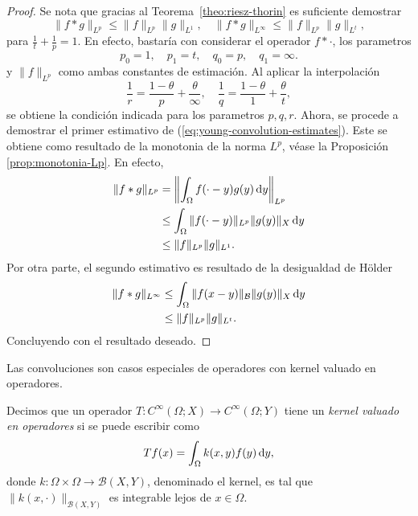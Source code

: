 \begin{proof}
    Se nota que gracias al Teorema~\ref{theo:riesz-thorin} es suficiente 
    demostrar 
    \begin{equation}\label{eq:young-convolution-estimates}
        \|f*g\|_{L^p} \leq \|f\|_{L^p} \|g\|_{L^1}, \quad 
        \|f*g\|_{L^\infty} \leq \|f\|_{L^p} \|g\|_{L^t},
    \end{equation}
    para $\frac{1}{t} + \frac{1}{p} = 1$. En efecto, bastaría con considerar 
    el operador $f * \cdot$, los parametros
    \begin{equation*}
        p_0 = 1, \quad p_1 = t, \quad q_0 = p, \quad q_1 = \infty.
    \end{equation*}
    y $\|f\|_{L^p}$ como ambas constantes de estimación.
    Al aplicar la interpolación
    \begin{equation*}
        \frac{1}{r} = \frac{1-\theta}{p} + \frac{\theta}{\infty}, \quad 
        \frac{1}{q} = \frac{1-\theta}{1} + \frac{\theta}{t},
    \end{equation*}
    se obtiene la condición indicada para los parametros $p, q, r$. Ahora, 
    se procede a demostrar el primer estimativo de
    (\ref{eq:young-convolution-estimates}). Este se obtiene como resultado de
    la monotonia de la norma $L^p$, véase la Proposición \ref{prop:monotonia-Lp}.
    En efecto,
    \begin{align*}
        \|f*g\|_{L^p} & = \left\| \int_{\Omega} f(\cdot-y)g(y)\mathop{}\!\mathrm{d} y 
        \right\|_{L^p} \\
        & \leq \int_{\Omega} \|f(\cdot-y)\|_{L^p} \|g(y)\|_X\mathop{}\!\mathrm{d} y \\
        & \leq \|f\|_{L^p}\|g\|_{L^1}.
    \end{align*}
    Por otra parte, el segundo estimativo es resultado de la desigualdad de 
    H\"older 
    \begin{align*}
        \|f*g\|_{L^\infty} & \leq \int_{\Omega} \|f(x-y)\|_\mathcal{B}\|g(y)\|_X \mathop{}\!\mathrm{d} y \\
        & \leq \|f\|_{L^p}\|g\|_{L^t}.
    \end{align*}
    Concluyendo con el resultado deseado.
\end{proof}
Las convoluciones son casos especiales de operadores con kernel valuado en operadores.
\begin{definition}
	Decimos que un operador $T:C^\infty(\Omega;X)\rightarrow C^\infty(\Omega;Y)$ tiene un \textit{kernel valuado en operadores} si se puede escribir como
	\begin{equation*}
		Tf(x) = \int_{\Omega}k(x, y)f(y)\mathop{}\!\mathrm{d} y,
	\end{equation*}
	donde $k:\Omega\times\Omega \rightarrow \mathcal{B}(X,Y)$, denominado el kernel, es tal que $\|k(x, \cdot)\|_{\mathcal{B}(X,Y)}$ es integrable lejos de $x \in \Omega $.
	\label{def:operator-kernel}
\end{definition}
